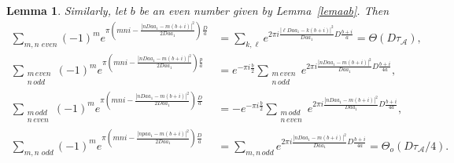 \documentclass[11pt, reqno]{amsart}
\theoremstyle{plain}
\newtheorem{lemma}[theorem]{Lemma}
\theoremstyle{definition}
\numberwithin{equation}{section}
\begin{document}
\begin{lemma}
   Similarly, let $b$ be an even number given by Lemma~\ref{lemaab}. Then
 \begin{align}
        \sum_{m,n\,\,even}(-1)^{m}e^{\pi(mni-\frac{|nDaa_{1}-m(b+i)|^{2}}{2Daa_{1}})\frac{D}{a}}&=\sum_{k,\ell}e^{2\pi i\frac{|\ell Daa_{1}-k(b+i)|^{2}}{Daa_{1}}D\frac{b+i}{a}}=\Theta(D\tau_{\mathcal{A}}),\label{even1}\\
        \sum_{\substack{m\,even\\n\,odd}}(-1)^{m}e^{\pi(mni-\frac{|nDaa_{1}-m(b+i)|^{2}}{2Daa_{1}})\frac{p}{a}}&=e^{-\pi i\frac{b}{2}}\sum_{\substack{m\,even\\n\,odd}}e^{2\pi i\frac{|nDaa_{1}-m(b+i)|^{2}}{Daa_{1}}D\frac{b+i}{4a}},\\
        \sum_{\substack{m\,odd\\n\,even}}(-1)^{m}e^{\pi(mni-\frac{|nDaa_{1}-m(b+i)|^{2}}{2Daa_{1}})\frac{D}{a}}&=-e^{-\pi i\frac{b}{2}}\sum_{\substack{m\,odd\\n\,even}}e^{2\pi i\frac{|nDaa_{1}-m(b+i)|^{2}}{Daa_{1}}D\frac{b+i}{4a}},\\
        \sum_{m,n\,\,odd}(-1)^{m}e^{\pi(mni-\frac{|npaa_{1}-m(b+i)|^{2}}{2Daa_{1}})\frac{D}{a}}&=\sum_{m,n\,odd}e^{2\pi i\frac{|nDaa_{1}-m(b+i)|^{2}}{Daa_{1}}D\frac{b+i}{4a}}=\Theta_{o}(D\tau_{\mathcal{A}}/4).\label{even2}
    \end{align}
\end{lemma}
\end{document}

